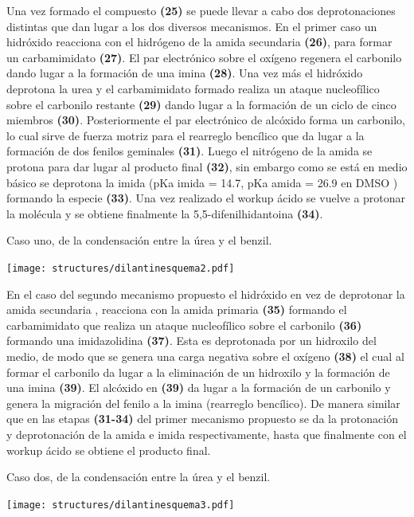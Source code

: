 \documentclass[fleqn,10pt]{SelfArx}
\begin{document}
Una vez formado el compuesto \textbf{(25)} se puede llevar a cabo dos deprotonaciones distintas que dan lugar a los dos diversos mecanismos. En el primer caso un hidróxido reacciona con el hidrógeno de la amida secundaria \cite{dunnavant1956}\cite{hayward1983} \textbf{(26)}, para formar un carbamimidato \textbf{(27)}. El par electrónico sobre el oxígeno regenera el carbonilo dando lugar a la formación de una imina \textbf{(28)}. Una vez más el hidróxido deprotona la urea y el carbamimidato formado realiza un ataque nucleofílico sobre el carbonilo restante \textbf{(29)} dando lugar a la formación de un ciclo de cinco miembros \textbf{(30)}. Posteriormente el par electrónico de alcóxido forma un carbonilo, lo cual sirve de fuerza motriz para el rearreglo bencílico que da lugar a la formación de dos fenilos geminales \textbf{(31)}. Luego el nitrógeno de la amida se protona para dar lugar al producto final \textbf{(32)}, sin embargo como se está en medio básico se deprotona la imida (pKa imida = 14.7, pKa amida = 26.9 en DMSO \cite{bordwellpkatableacidityindmso}) formando la especie \textbf{(33)}. Una vez realizado el workup ácido se vuelve a protonar la molécula y se obtiene finalmente la 5,5-difenilhidantoina \textbf{(34)}.
\begin{scheme}[h]
	\centering
	\caption{Caso uno, de la condensaci\'on entre la \'urea y el benzil.}
	\texttt{[image: structures/dilantinesquema2.pdf]}
\end{scheme}

En el caso del segundo mecanismo propuesto el hidróxido en vez de deprotonar la amida secundaria \cite{mahmoodi2004}\cite{gbaguidi2011}, reacciona con la amida primaria \textbf{(35)} formando el carbamimidato que realiza un ataque nucleofílico sobre el carbonilo \textbf{(36)} formando una imidazolidina \textbf{(37)}. Esta es deprotonada por un hidroxilo del medio, de modo que se genera una carga negativa sobre el oxígeno \textbf{(38)} el cual al formar el carbonilo da lugar a la eliminación de un hidroxilo y la formación de una imina \textbf{(39)}. El alcóxido en \textbf{(39)} da lugar a la formación de un carbonilo y genera la migración del fenilo a la imina (rearreglo bencílico). De manera similar que en las etapas \textbf{(31-34)} del primer mecanismo propuesto se da la protonación y deprotonación de la amida e imida respectivamente, hasta que finalmente con el workup ácido se obtiene el producto final.
\begin{scheme}[h]
	\centering
	\caption{Caso dos, de la condensaci\'on entre la \'urea y el benzil.}
	\texttt{[image: structures/dilantinesquema3.pdf]}
\end{scheme}
\end{document}
